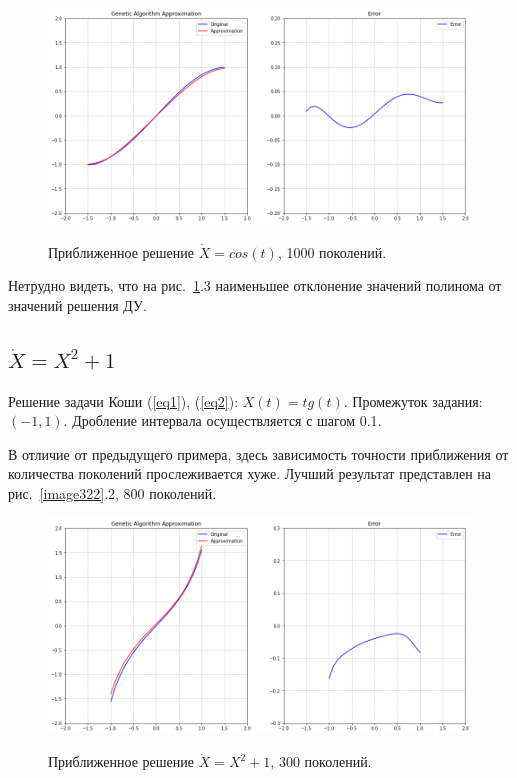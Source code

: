 \documentclass[12pt, a4paper]{article}
\begin{document}
    \begin{figure}[h!]
        \center
        \includegraphics[width = 13cm]{f1_1000.png}
        \label{image313}
        \caption{Приближенное решение $\dot{X} = cos(t)$, 1000 поколений.}
    \end{figure}
    
    Нетрудно видеть, что на рис.~\ref{image313}.3 наименьшее отклонение 
    значений полинома от значений решения ДУ.
    
    \subsection{$\dot{X} = X^{2} + 1$}
    
    Решение задачи Коши (\ref{eq1}), (\ref{eq2}): $X(t) = tg(t)$. Промежуток 
    задания: $(-1,1)$. Дробление интервала осуществляется с шагом 0.1.
    
    В отличие от предыдущего примера, здесь зависимость точности приближения 
    от количества поколений прослеживается хуже. Лучший результат 
    представлен на рис.~\ref{image322}.2, 800 поколений.
    
    \begin{figure}[h!]
        \center
        \includegraphics[width = 13cm]{f2_300.png}
        \label{image321}
        \caption{Приближенное решение $\dot{X} = X^{2} + 1$, 300 поколений.}
    \end{figure}
    
\end{document}
